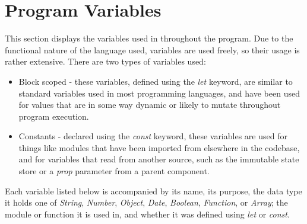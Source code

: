 \section{Program Variables}
This section displays the variables used in throughout the program. Due to the functional nature of the language used, variables are used freely, so their usage is rather extensive. There are two types of variables used:

\begin{itemize}
  \item Block scoped - these variables, defined using the \textit{let} keyword, are similar to standard variables used in most programming languages, and have been used for values that are in some way dynamic or likely to mutate throughout program execution.
  \item Constants - declared using the \textit{const} keyword, these variables are used for things like modules that have been imported from elsewhere in the codebase, and for variables that read from another source, such as the immutable state store or a \textit{prop} parameter from a parent component.
\end{itemize}

Each variable listed below is accompanied by its name, its purpose, the data type it holds one of \textit{String}, \textit{Number}, \textit{Object}, \textit{Date}, \textit{Boolean}, \textit{Function}, or \textit{Array}; the module or function it is used in, and whether it was defined using \textit{let} or \textit{const}.

